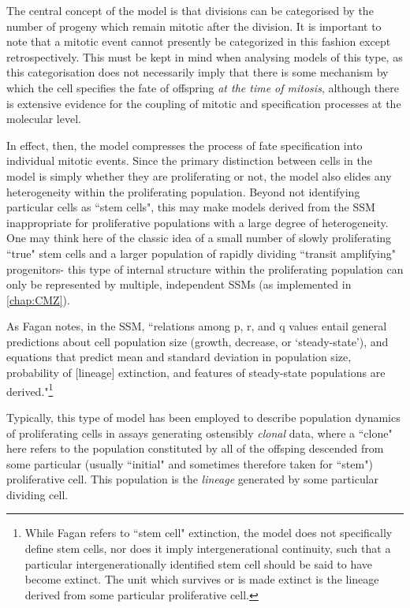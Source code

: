 The central concept of the model is that divisions can be categorised by the number of progeny which remain mitotic after the division. It is important to note that a mitotic event cannot presently be categorized in this fashion except retrospectively. This must be kept in mind when analysing models of this type, as this categorisation does not necessarily imply that there is some mechanism by which the cell specifies the fate of offspring \textit{at the time of mitosis}, although there is extensive evidence for the coupling of mitotic and specification processes at the molecular level.

In effect, then, the model compresses the process of fate specification into individual mitotic events. Since the primary distinction between cells in the model is simply whether they are proliferating or not, the model also elides any heterogeneity within the proliferating population. Beyond not identifying particular cells as ``stem cells", this may make models derived from the SSM inappropriate for proliferative populations with a large degree of heterogeneity. One may think here of the classic idea of a small number of slowly proliferating ``true" stem cells and a larger population of rapidly dividing ``transit amplifying" progenitors- this type of internal structure within the proliferating population can only be represented by multiple, independent SSMs (as implemented in \autoref{chap:CMZ}).

As Fagan notes, in the SSM, ``relations among p, r, and q values entail general predictions about cell population size (growth, decrease, or ‘steady-state’), and equations that predict mean and standard deviation in population size, probability of [lineage] extinction, and features of steady-state populations are derived."\footnote{While Fagan refers to ``stem cell" extinction, the model does not specifically define stem cells, nor does it imply intergenerational continuity, such that a particular intergenerationally identified stem cell should be said to have become extinct. The unit which survives or is made extinct is the lineage derived from some particular proliferative cell.}\cite[p.60]{Fagan2013}

Typically, this type of model has been employed to describe population dynamics of proliferating cells in assays generating ostensibly \textit{clonal} data, where a ``clone" here refers to the population constituted by all of the offsping descended from some particular (usually ``initial" and sometimes therefore taken for ``stem") proliferative cell. This population is the \textit{lineage} generated by some particular dividing cell.

